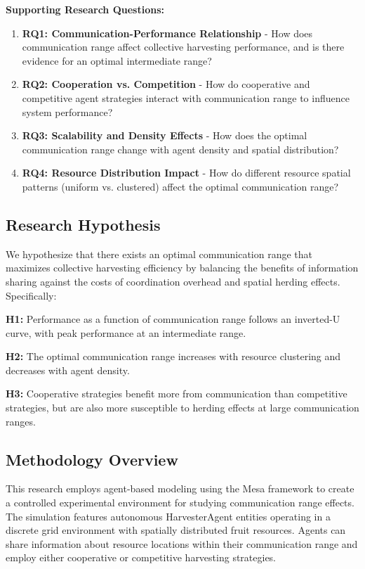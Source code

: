 \documentclass[12pt,a4paper]{article}
\begin{document}
\textbf{Supporting Research Questions:}
\begin{enumerate}
    \item \textbf{RQ1: Communication-Performance Relationship} - How does communication range affect collective harvesting performance, and is there evidence for an optimal intermediate range?
    \item \textbf{RQ2: Cooperation vs. Competition} - How do cooperative and competitive agent strategies interact with communication range to influence system performance?
    \item \textbf{RQ3: Scalability and Density Effects} - How does the optimal communication range change with agent density and spatial distribution?
    \item \textbf{RQ4: Resource Distribution Impact} - How do different resource spatial patterns (uniform vs. clustered) affect the optimal communication range?
\end{enumerate}

\subsection{Research Hypothesis}

We hypothesize that there exists an optimal communication range that maximizes collective harvesting efficiency by balancing the benefits of information sharing against the costs of coordination overhead and spatial herding effects. Specifically:

\textbf{H1:} Performance as a function of communication range follows an inverted-U curve, with peak performance at an intermediate range.

\textbf{H2:} The optimal communication range increases with resource clustering and decreases with agent density.

\textbf{H3:} Cooperative strategies benefit more from communication than competitive strategies, but are also more susceptible to herding effects at large communication ranges.

\subsection{Methodology Overview}

This research employs agent-based modeling using the Mesa framework to create a controlled experimental environment for studying communication range effects. The simulation features autonomous HarvesterAgent entities operating in a discrete grid environment with spatially distributed fruit resources. Agents can share information about resource locations within their communication range and employ either cooperative or competitive harvesting strategies.
\end{document}
